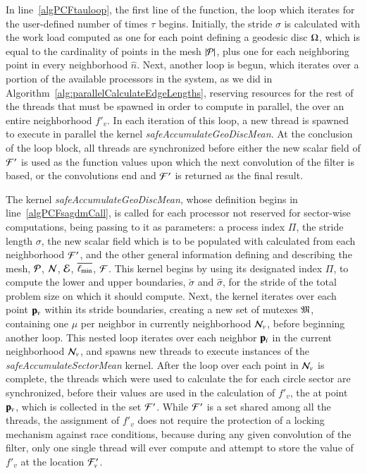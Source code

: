 In line~\ref{algPCFtauloop}, the first line of the function, the loop which iterates for the user-defined number of times $\tau$ begins. Initially, the stride $\sigma$ is calculated with the work load computed as one for each point defining a geodesic disc $\Omega$, which is equal to the cardinality of points in the mesh $|\mathcal{P}|$, plus one for each neighboring point in every neighborhood $\hat{n}$. Next, another loop is begun, which iterates over a portion of the available processors in the system, as we did in Algorithm~\ref{alg:parallelCalculateEdgeLengths}, reserving resources for the rest of the threads that must be spawned in order to compute in parallel, the \wmfv{} over an entire neighborhood $f'_v$. In each iteration of this loop, a new thread is spawned to execute in parallel the kernel \textit{safeAccumulateGeoDiscMean}. At the conclusion of the loop block, all threads are synchronized before either the new scalar field of  $\mathcal{F}'$ is used as the function values upon which the next convolution of the filter is based, or the convolutions end and $\mathcal{F}'$ is returned as the final result.

The kernel \textit{safeAccumulateGeoDiscMean}, whose definition begins in line~\ref{algPCFsagdmCall}, is called for each processor not reserved for sector-wise computations, being passing to it as parameters: a process index $\Pi$, the stride length $\sigma$, the new scalar field which is to be populated with calculated  from each neighborhood $\mathcal{F}'$, and the other general information defining and describing the mesh, $\mathcal{P}$, $\mathcal{N}$, $\mathcal{E}$, $\overline{\ell_\text{min}}$, $\mathcal{F}$. This kernel begins by using its designated index $\Pi$, to compute the lower and upper boundaries, $\check{\sigma}$ and $\hat{\sigma}$, for the stride of the total problem size on which it should compute. Next, the kernel iterates over each point $\mathbf{p}_v$ within its stride boundaries, creating a new set of mutexes $\mathfrak{M}$, containing one $\mu$ per neighbor in currently neighborhood $\mathcal{N}_v$, before beginning another loop. This nested loop iterates over each neighbor $\mathbf{p}_i$ in the current neighborhood $\mathcal{N}_v$, and spawns new threads to execute instances of the \textit{safeAccumulateSectorMean} kernel. After the loop over each point in $\mathcal{N}_v$ is complete, the threads which were used to calculate the  for each circle sector are synchronized, before their values are used in the calculation of $f'_v$, the \wmfv{} at point $\mathbf{p}_v$, which is collected in the set $\mathcal{F}'$. While $\mathcal{F}'$ is a set shared among all the threads, the assignment of $f'_v$ does not require the protection of a locking mechanism against race conditions, because during any given convolution of the filter, only one single thread will ever compute and attempt to store the value of $f'_v$ at the location $\mathcal{F}'_v$.


